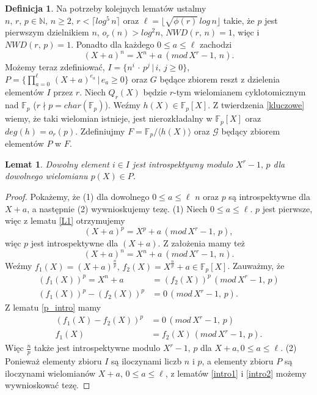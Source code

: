 \documentclass[declaration,shortabstract]{iithesis}
\theoremstyle{definition}
\newtheorem{definition}{Definicja}
\theoremstyle{remark} \newtheorem{observation}{Obserwacja}
\theoremstyle{plain} \newtheorem{theorem}{Twierdzenie}
\theoremstyle{plain} \newtheorem{lemma}{Lemat}
\theoremstyle{remark} \newtheorem*{remark*}{Uwaga}
\theoremstyle{reminder} \newtheorem*{reminder*}{Przypomnienie}
\begin{document}
\begin{definition}\label{def}
	Na potrzeby kolejnych lematów ustalmy $n, \, r, \, p \in \mathbb{N}, \, n \geq 2, \, r < \lceil log^5 \, n \rceil$ oraz $\ell = \lfloor\sqrt{\phi (r)} \, log \, n \rfloor$ takie, że $p$ jest pierwszym dzielnikiem $n$, $o_r(n) > log^2n$, $NWD(r, \, n) = 1$, więc i $NWD(r, \, p) = 1$. Ponadto dla każdego $0 \leq a \leq \ell$ zachodzi \[(X + a)^n = X^n + a \: (mod \, X^r - 1, \, n).\] Możemy teraz zdefiniować, $I = \{n^i \, \cdot \, p^j \, | \, i, \, j \geq 0\}$, $P = \{\prod_{a=0}^{\ell} \, (X + a)^{e_a} \, | \, e_a \geq 0\}$ oraz $G$ będące zbiorem reszt z dzielenia elementów $I$ przez $r$. Niech $Q_r(X)$ będzie $r$-tym wielomianem cyklotomicznym nad $\mathbb{F}_p$ ($ r \nmid p = char(\mathbb{F}_p)$). Weźmy $h(X) \in \mathbb{F}_p[X]$. Z twierdzenia \ref{kluczowe} wiemy, że taki wielomian istnieje, jest nierozkładalny w $\mathbb{F}_p[X]$ oraz $deg(h) = o_r(p)$. Zdefiniujmy $F = \mathbb{F}_p / \langle h(X) \rangle$ oraz $\mathcal{G}$ będący zbiorem elementów $P$ w $F$.
\end{definition}
\begin{lemma}\label{intro}
	Dowolny element $i \in I$ jest introspektywny modulo $X^r - 1, \, p$ dla dowolnego wielomianu $p(X) \in P$.
\end{lemma}
	
\begin{proof}
	Pokażemy, że (1) dla dowolnego $0 \leq a \leq \ell$ $n$ oraz $p$ są introspektywne dla $X + a$, a następnie (2) wywnioskujemy tezę. \newline
	(1) Niech $0 \leq a \leq \ell$. $p$ jest pierwsze, więc z lematu \ref{L1} otrzymujemy \[(X + a)^p = X^p + a \, (mod \, X^r - 1, \, p),\] więc $p$ jest introspektywne dla $(X + a)$. Z założenia mamy też  \[(X + a)^n = X^n + a \: (mod \, X^r - 1, \, n).\] Weźmy $f_1(X) = (X + a)^{\frac{n}{p}}, \, f_2(X) = X^{\frac{n}{p}} + a \in \mathbb{F}_p[X]$. Zauważmy, że 
	\begin{align*}
		(f_1(X))^p = X^n + a    & = (f_2(X))^p \, (mod \, X^r - 1, \, p) \\
		(f_1(X))^p - (f_2(X))^p & = 0 \, (mod \, X^r - 1, \, p).         
	\end{align*}
	Z lematu \ref{p_intro} mamy
	\begin{align*}
		(f_1(X) - f_2(X))^p & = 0 \, (mod \, X^r - 1, \, p)       \\
		f_1(X)              & = f_2(X) \, (mod \, X^r - 1, \, p). 
	\end{align*}
	Więc $\frac{n}{p}$ także jest introspektywne modulo $X^r - 1, \, p$ dla $X + a, 0 \leq a \leq \ell$.
	\newline(2) Ponieważ elementy zbioru $I$ są iloczynami liczb $n$ i $p$, a elementy zbioru $P$ są iloczynami wielomianów $X + a, \, 0 \leq a \leq \ell$, z lematów \ref{intro1} i \ref{intro2} możemy wywnioskować tezę.
\end{proof} 
	
\end{document}
